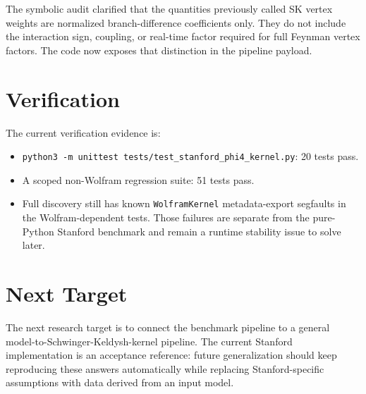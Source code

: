 \documentclass[11pt]{article}
\begin{document}
The symbolic audit clarified that the quantities previously called SK vertex
weights are normalized branch-difference coefficients only. They do not include
the interaction sign, coupling, or real-time factor required for full Feynman
vertex factors. The code now exposes that distinction in the pipeline payload.

\section*{Verification}

The current verification evidence is:
\begin{itemize}
  \item \texttt{python3 -m unittest tests/test\_stanford\_phi4\_kernel.py}:
  20 tests pass.
  \item A scoped non-Wolfram regression suite: 51 tests pass.
  \item Full discovery still has known \texttt{WolframKernel}
  metadata-export segfaults in the Wolfram-dependent tests. Those failures are
  separate from the pure-Python Stanford benchmark and remain a runtime
  stability issue to solve later.
\end{itemize}

\section*{Next Target}

The next research target is to connect the benchmark pipeline to a general
model-to-Schwinger-Keldysh-kernel pipeline. The current Stanford implementation
is an acceptance reference: future generalization should keep reproducing these
answers automatically while replacing Stanford-specific assumptions with data
derived from an input model.
\end{document}
